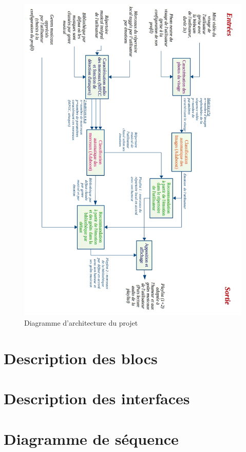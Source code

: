 \documentclass[a4paper,10pt]{report}
\theoremstyle{remark}
\begin{document}
		\begin{figure}[htp]
		\includegraphics[scale=0.60]{images/diagrammeArchitecture.jpg}
		\caption{Diagramme d'architecture du projet}
		\label{diagArchi}
		\end{figure}

	\section{Description des blocs}
		
		
	\section{Description des interfaces}
		
		
	\section{Diagramme de séquence}
		
		
\end{document}
